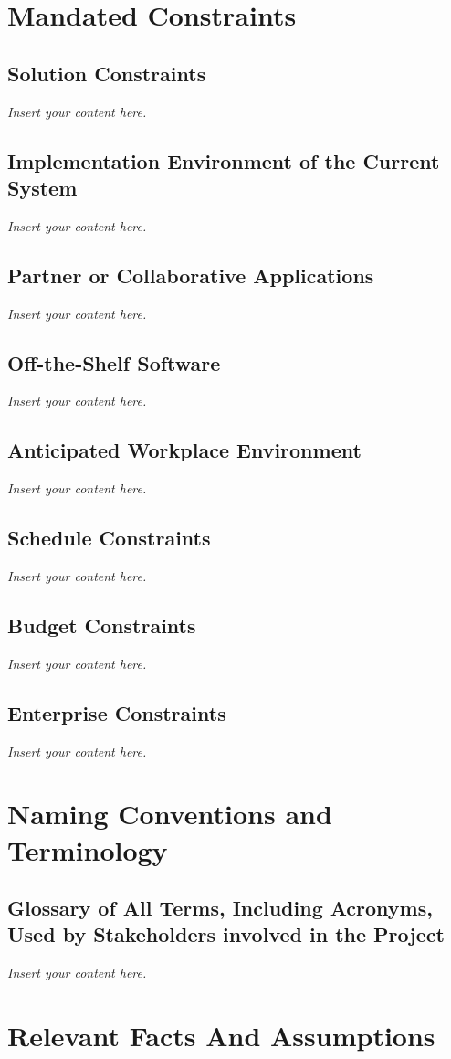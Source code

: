 \documentclass[12pt]{article}
\newcommand{\lips}{\textit{Insert your content here.}}
\begin{document}
\section{Mandated Constraints}
\subsection{Solution Constraints}
\lips
\subsection{Implementation Environment of the Current System}
\lips
\subsection{Partner or Collaborative Applications}
\lips
\subsection{Off-the-Shelf Software}
\lips
\subsection{Anticipated Workplace Environment}
\lips
\subsection{Schedule Constraints}
\lips
\subsection{Budget Constraints}
\lips
\subsection{Enterprise Constraints}
\lips

\section{Naming Conventions and Terminology}
\subsection{Glossary of All Terms, Including Acronyms, Used by Stakeholders
involved in the Project}
\lips

\section{Relevant Facts And Assumptions}
\end{document}
